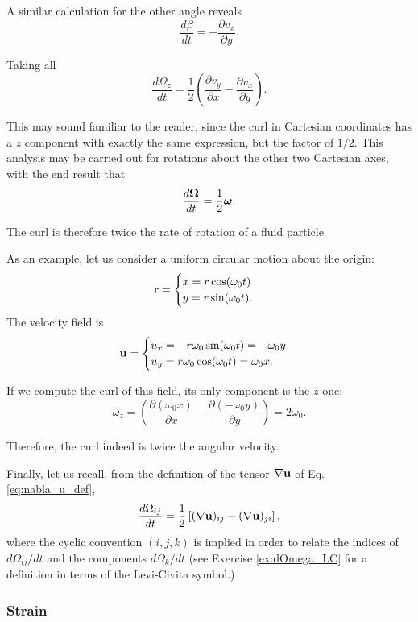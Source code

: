 A similar calculation for the other angle reveals
\[
\frac{d \beta}{dt} = - \frac{\partial v_x}{\partial y}  .
\]

Taking all
\[
\frac{d\Omega_z}{dt} = \frac12
\left(
  \frac{\partial v_y}{\partial x}  -
  \frac{\partial v_x}{\partial y}
\right) .
\]

This may sound familiar to the reader, since the curl in Cartesian
coordinates has a $z$ component with exactly the same expression, but
the factor of $1/2$. This analysis may be carried out for
rotations about the other two Cartesian axes, with the end result that
\[
 \frac{d \bm{\Omega} }{dt} = \frac12 \bm{\omega} .
\]

The curl is therefore twice the rate of rotation of a fluid particle.


As an example, let us consider a uniform circular motion about the
origin:
\[
\mathbf{r} =
\begin{cases}
x =r \cos(\omega_0 t) \\
y =r \sin(\omega_0 t) .
\end{cases}
\]
The velocity field is
\[
\mathbf{u} =
\begin{cases}
u_x= -r \omega_0 \sin(\omega_0 t) = -\omega_0 y \\
u_y=  r \omega_0 \cos(\omega_0 t) =  \omega_0 x.
\end{cases}
\]

If we compute the curl of this field, its only component is the $z$ one:
\[
\omega_z= \left(
  \frac{\partial (\omega_0  x)}{\partial x}  -
  \frac{\partial (- \omega_0 y) }{\partial y}
\right) =  2 \omega_0 . 
\]

Therefore, the curl indeed is twice the angular velocity.

Finally, let us recall, from the definition of the tensor
$\nabla \mathbf{u}$ of Eq. \ref{eq:nabla_u_def},
\begin{equation}
  \label{eq:dOmega_as_grad_u}
  \frac{d\Omega_{ij}}{dt} = \frac12
  \left[
    (\nabla \mathbf{u})_{ij} -
    (\nabla \mathbf{u})_{ji}
  \right] ,  
\end{equation}
%
where the cyclic convention $(i,j,k)$ is implied in order to relate
the indices of $d\Omega_{ij}/ dt$ and the components $d\Omega_k/ dt$
(see Exercise \ref{ex:dOmega_LC} for a definition in terms of the
Levi-Civita symbol.)


\subsubsection{Strain}

